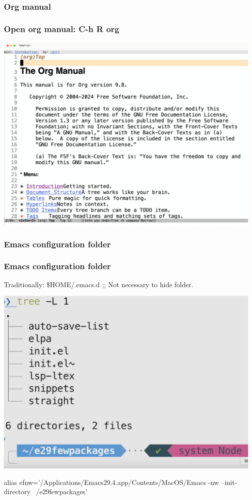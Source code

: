 \documentclass[aspectratio=169]{beamer}
\begin{document}
\subsubsection{Org manual}
\begin{frame}
\frametitle{Open org manual: C-h R org}
\begin{center}
    \includegraphics[scale=0.2]{Figures/orgManual.png}
\end{center}
\end{frame}




\subsubsection{Emacs configuration folder}
\begin{frame}
\frametitle{Emacs configuration folder }
Traditionally: \$HOME/.emacs.d ;; Not necessary to hide folder.
\begin{center}
    \includegraphics[scale=0.28]{Figures/tree.png}
\end{center}
alias efnw='/Applications/Emacs29.4.app/Contents/MacOS/Emacs -nw --init-directory ~/e29fewpackages'
\end{frame}
\end{document}
